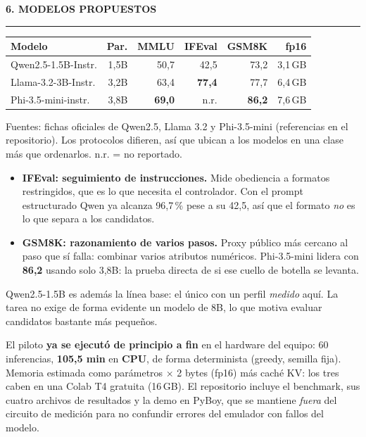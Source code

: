 \documentclass[9pt,a4paper]{extarticle}
\newcommand{\heading}[1]{%
  \par\vspace{1.1mm}\noindent
  {\color{navy}\bfseries\small\MakeUppercase{#1}}
  \par\vspace{0.7mm}\noindent
  {\color{amber}\rule{\linewidth}{1.1pt}}
  \par\vspace{0.6mm}\noindent\ignorespaces}
\begin{document}
\begin{multicols}{2}
\heading{6. Modelos propuestos}
{\centering
\begin{tabular}{@{}lrrrrr@{}}
\toprule
\textbf{Modelo} & \textbf{Par.} & \textbf{MMLU} & \textbf{IFEval} & \textbf{GSM8K} & \textbf{fp16}\\
\midrule
Qwen2.5-1.5B-Instr. & 1,5B & 50,7 & 42,5 & 73,2 & 3,1\,GB\\
Llama-3.2-3B-Instr. & 3,2B & 63,4 & \textbf{77,4} & 77,7 & 6,4\,GB\\
Phi-3.5-mini-instr. & 3,8B & \textbf{69,0} & n.r. & \textbf{86,2} & 7,6\,GB\\
\bottomrule
\end{tabular}\par}
\vspace{0.3mm}
{\footnotesize Fuentes: fichas oficiales de Qwen2.5, Llama 3.2 y Phi-3.5-mini (referencias en el repositorio). Los protocolos difieren, as\'i que ubican a los modelos en una clase m\'as que ordenarlos. n.r. = no reportado.}
\vspace{0.6mm}

\begin{itemize}
\item \textbf{IFEval: seguimiento de instrucciones.} Mide obediencia a formatos restringidos, que es lo que necesita el controlador. Con el prompt estructurado Qwen ya alcanza 96,7\,\% pese a su 42,5, as\'i que el formato \emph{no} es lo que separa a los candidatos.
\item \textbf{GSM8K: razonamiento de varios pasos.} Proxy p\'ublico m\'as cercano al paso que s\'i falla: combinar varios atributos num\'ericos. Phi-3.5-mini lidera con \textbf{86,2} usando solo 3,8B: la prueba directa de si ese cuello de botella se levanta.
\end{itemize}
Qwen2.5-1.5B es adem\'as la l\'inea base: el \'unico con un perfil \emph{medido} aqu\'i. La tarea no exige de forma evidente un modelo de 8B, lo que motiva evaluar candidatos bastante m\'as peque\~nos.

\end{multicols}

\vspace{-2mm}
\begin{tcolorbox}[colback=paper,colframe=navy,boxrule=0.9pt,left=2.5mm,right=2.5mm,
                  top=1.2mm,bottom=1.2mm,arc=1mm,
                  fonttitle=\bfseries\footnotesize,coltitle=white,colbacktitle=navy,
                  title={7. VIABILIDAD DE EJECUCI\'ON Y REPRODUCIBILIDAD}]
\footnotesize
El piloto \textbf{ya se ejecut\'o de principio a fin} en el hardware del equipo: 60 inferencias, \textbf{105,5 min} en \textbf{CPU}, de forma determinista (greedy, semilla fija). Memoria estimada como par\'ametros $\times$ 2 bytes (fp16) m\'as cach\'e KV: los tres caben en una Colab T4 gratuita (16\,GB). El repositorio incluye el benchmark, sus cuatro archivos de resultados y la demo en PyBoy, que se mantiene \emph{fuera} del circuito de medici\'on para no confundir errores del emulador con fallos del modelo.
\end{tcolorbox}
\end{document}
